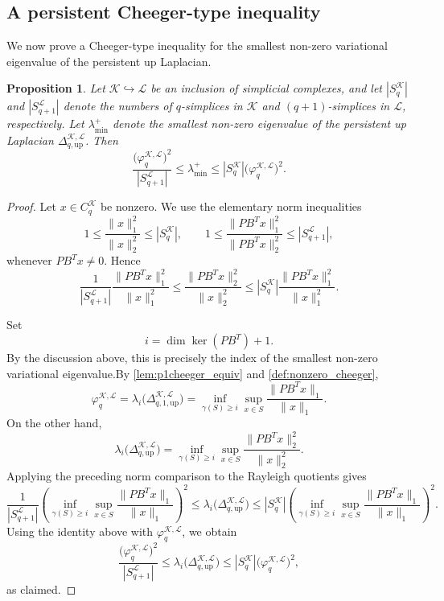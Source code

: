 \documentclass{article}
\newtheorem{proposition}{Proposition}[section]
\newcommand{\KK}{\mathcal{K}}
\newcommand{\LL}{\mathcal{L}}
\begin{document}
\subsection{A persistent Cheeger-type inequality}\label{sec:JZ_cheeger_ineq}

We now prove a Cheeger-type inequality for the smallest non-zero variational
eigenvalue of the persistent up Laplacian.

\begin{proposition}\label{prop_cheeger_ineq}
Let \(\KK\hookrightarrow \LL\) be an inclusion of simplicial complexes, and
let \(|S_q^\KK|\) and \(|S_{q+1}^\LL|\) denote the numbers of \(q\)-simplices
in \(\KK\) and \((q+1)\)-simplices in \(\LL\), respectively. Let
\(\lambda_{\min}^+\) denote the smallest non-zero eigenvalue of
the persistent up Laplacian \(\Delta_{q,\mathrm{up}}^{\KK,\LL}\). Then
\begin{equation}\label{ineq:persistent_cheeger}
\frac{\bigl(\varphi_q^{\KK,\LL}\bigr)^2}{|S_{q+1}^{\LL}|}
\leq
\lambda_{\min}^+
\leq
|S_q^\KK|\bigl(\varphi_q^{\KK,\LL}\bigr)^2 .
\end{equation}
\end{proposition}

\begin{proof}
Let \(x\in C_q^\KK\) be nonzero. We use the elementary norm inequalities
\[
1\leq \frac{\|x\|_1^2}{\|x\|_2^2}\leq |S_q^\KK|,
\qquad
1\leq
\frac{\|PB^T x\|_1^2}{\|PB^T x\|_2^2}
\leq |S_{q+1}^{\LL}|,
\]
whenever \(PB^T x\neq 0\). Hence
\[
\frac{1}{|S_{q+1}^{\LL}|}
\frac{\|PB^T x\|_1^2}{\|x\|_1^2}
\leq
\frac{\|PB^T x\|_2^2}{\|x\|_2^2}
\leq
|S_q^\KK|
\frac{\|PB^T x\|_1^2}{\|x\|_1^2}.
\]

Set
\[
i=\dim\ker(PB^T)+1.
\]
By the discussion above, this is precisely the index of the smallest non-zero variational eigenvalue.By \cref{lem:p1cheeger_equiv} and \cref{def:nonzero_cheeger},
\[
\varphi_q^{\KK,\LL}
=
\lambda_i\bigl(\Delta_{q,1,\mathrm{up}}^{\KK,\LL}\bigr)
=
\inf_{\gamma(S)\geq i}
\sup_{x\in S}
\frac{\|PB^T x\|_1}{\|x\|_1}.
\]
On the other hand,
\[
\lambda_i\bigl(\Delta_{q,\mathrm{up}}^{\KK,\LL}\bigr)
=
\inf_{\gamma(S)\geq i}
\sup_{x\in S}
\frac{\|PB^T x\|_2^2}{\|x\|_2^2}.
\]
Applying the preceding norm comparison to the Rayleigh quotients gives
\[
\frac{1}{|S_{q+1}^{\LL}|}
\left(
\inf_{\gamma(S)\geq i}
\sup_{x\in S}
\frac{\|PB^T x\|_1}{\|x\|_1}
\right)^2
\leq
\lambda_i\bigl(\Delta_{q,\mathrm{up}}^{\KK,\LL}\bigr)
\leq
|S_q^\KK|
\left(
\inf_{\gamma(S)\geq i}
\sup_{x\in S}
\frac{\|PB^T x\|_1}{\|x\|_1}
\right)^2.
\]
Using the identity above with \(\varphi_q^{\KK,\LL}\), we obtain
\[
\frac{\bigl(\varphi_q^{\KK,\LL}\bigr)^2}{|S_{q+1}^{\LL}|}
\leq
\lambda_i\bigl(\Delta_{q,\mathrm{up}}^{\KK,\LL}\bigr)
\leq
|S_q^\KK|\bigl(\varphi_q^{\KK,\LL}\bigr)^2,
\]
as claimed.
\end{proof}
\end{document}
